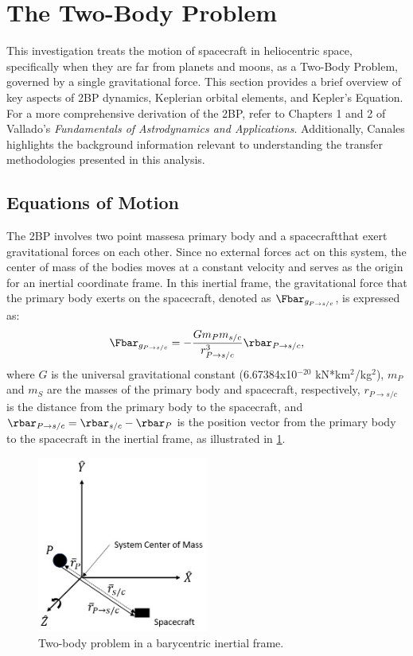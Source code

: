 \section{The Two-Body Problem}
This investigation treats the motion of spacecraft in heliocentric space, specifically when they
are far from planets and moons, as a Two-Body Problem, governed by a single gravitational force.
This section provides a brief overview of key aspects of 2BP dynamics, Keplerian orbital elements,
and Kepler's Equation. For a more comprehensive derivation of the 2BP, refer to Chapters 1 and 2 of
Vallado's \emph{Fundamentals of Astrodynamics and Applications}\cite{Vallado:2013}. Additionally,
Canales highlights the background information relevant to understanding the transfer methodologies
presented in this analysis\cite{Canales:2021}.

\subsection{Equations of Motion}
The 2BP involves two point masses\textemdash a primary body and a spacecraft\textemdash that exert
gravitational forces on each other. Since no external forces act on this system, the center of mass
of the bodies moves at a constant velocity and serves as the origin for an inertial coordinate
frame. In this inertial frame, the gravitational force that the primary body exerts on the
spacecraft, denoted as $\Fbar_{g_{P\rightarrow s/c}}$, is expressed as:
\begin{equation}
    \Fbar_{g_{P\rightarrow s/c}}=-\frac{Gm_{P}m_{s/c}}{r_{P\rightarrow s/c}^{3}}\rbar_{P\rightarrow s/c},
    \label{eq:gravity}
\end{equation}
where $G$ is the universal gravitational constant (6.67384x10$^{-20}$ kN*km$^{2}$/kg$^{2}$),
$m_{P}$ and $m_{S}$ are the masses of the primary body and spacecraft, respectively,
$r_{P\rightarrow s/c}$ is the distance from the primary body to the spacecraft, and
$\rbar_{P\rightarrow s/c}=\rbar_{s/c}-\rbar_{P}$ is the position vector from the primary body to
the spacecraft in the inertial frame, as illustrated in \cref{fig:2BP}.

\begin{figure}[ht]
    \centering
    \includegraphics[width=0.5\textwidth]{figures/TBP.jpg}
    \caption{Two-body problem in a barycentric inertial frame.}
    \label{fig:2BP}
\end{figure}

